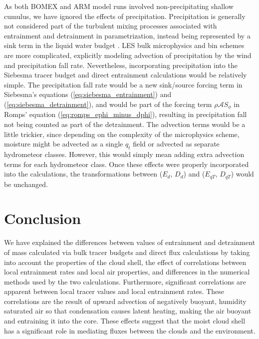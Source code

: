 \documentclass[12pt]{article}
\begin{document}
As both BOMEX and ARM model runs involved non-precipitating shallow cumulus, 
we have ignored the effects of precipitation.  Precipitation is generally not
considered part of the turbulent mixing processes associated with entrainment 
and detrainment in parametrization, instead being represented by a sink 
term in the liquid water budget \citep{Tiedtke1989, Kain1990}.  LES bulk microphysics and bin schemes are more complicated, explicitly modeling 
advection of precipitation by the wind and precipitation fall rate.  
Nevertheless, incorporating precipitation into the Siebesma tracer budget 
and direct entrainment calculations would be relatively simple.  The
precipitation fall rate would be a new sink/source forcing term in Siebesma's
equations (\ref{eq:siebesma_entrainment}) and (\ref{eq:siebesma_detrainment}),
and would be part of the forcing term $\rho \mathcal{A}S_\phi$ in Romps'
 equation (\ref{eq:romps_ephi_minus_dphi}), resulting in precipitation fall 
not being counted as part of the detrainment.  The advection terms would
be a little trickier, since depending on the complexity of the microphysics 
scheme, moisture might be advected as a single $q_t$ field or advected as 
separate hydrometeor classes.  However, this would simply mean adding extra 
advection terms for each hydrometeor class.  Once these effects were properly
incorporated into the calculations, the transformations between 
($E_d$, $D_d$) and ($E_{qT}$, $D_{qT}$) would be unchanged.


\section{Conclusion}

We have explained the differences between values of entrainment and detrainment 
of mass calculated via bulk tracer budgets and direct flux calculations by 
taking into account the properties of the cloud shell, the effect of 
correlations between local entrainment rates and local air properties, 
and differences in the numerical methods used by the two calculations.  
Furthermore, significant correlations are apparent between local tracer 
values and local entrainment rates.  These correlations are the result of 
upward advection of negatively buoyant, humidity saturated air so that
condensation causes latent heating, making the air buoyant and entraining it 
into the core.  These effects suggest that the moist cloud shell has a
significant role in mediating fluxes between the clouds and the environment. 
\end{document}
